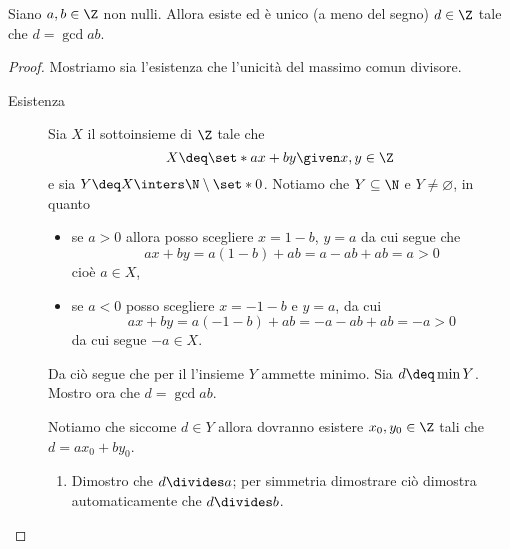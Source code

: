 \begin{theorem}
    Siano $a, b \in \Z$ non nulli. Allora esiste ed è unico (a meno del segno) $d \in \Z$ tale che $d = \gcd{a}{b}$.
\end{theorem}
\begin{proof}
    Mostriamo sia l'esistenza che l'unicità del massimo comun divisore.
    \begin{description}
        \item[Esistenza] Sia $X$ il sottoinsieme di $\Z$ tale che \[
            X \deq \set*{ax + by \given x, y \in \Z}    
        \] e sia $Y \deq X \inters \N \setminus \set*{0}$. Notiamo che $Y \subseteq \N$ e $Y \neq \varnothing$, in quanto \begin{itemize}
            \item se $a > 0$ allora posso scegliere $x = 1 - b$, $y = a$ da cui segue che \[
                ax + by = a(1-b)+ab = a - ab + ab = a > 0
            \] cioè $a \in X$,
            \item se $a < 0$ posso scegliere $x = - 1 - b$ e $y = a$, da cui \[
                ax + by = a(-1-b)+ab = -a - ab + ab = -a > 0 
            \] da cui segue $-a \in X$.
        \end{itemize}

        Da ciò segue che per il  l'insieme $Y$ ammette minimo. Sia $d \deq \min Y$. Mostro ora che $d = \gcd{a}{b}$.

        Notiamo che siccome $d \in Y$ allora dovranno esistere $x_0, y_0 \in \Z$ tali che $d = ax_0 + by_0$.
        \begin{enumerate}[label={(\roman*)}]
            \item Dimostro che $d \divides a$; per simmetria dimostrare ciò dimostra automaticamente che $d \divides b$.
            

\end{enumerate}
\end{description}
\end{proof}
